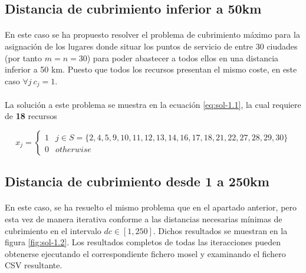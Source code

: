 \documentclass[spanish]{article}
\begin{document}
		\subsection{Distancia de cubrimiento inferior a 50km}
		\label{sec:1.1}

			\paragraph{}
			En este caso se ha propuesto resolver el problema de cubrimiento máximo para la asignación de los lugares donde situar los puntos de servicio de entre 30 ciudades (por tanto $m = n = 30$) para poder abastecer a todos ellos en una distancia inferior a 50 km. Puesto que todos los recursos presentan el mismo coste, en este caso $\forall j \ c_{j} = 1$.

			\paragraph{}
			La solución a este problema se muestra en la ecuación \eqref{eq:sol-1.1}, la cual requiere de \textbf{18} recursos

			\begin{equation}
			\label{eq:sol-1.1}
				x_{j} =
					\begin{cases}
		      	1 & j \in S = \{2,  4,  5,  9,  10,  11,  12,  13,  14,  16,  17,  18,  21,  22,  27,  28,  29,  30 \} \\
		      	0 & otherwise
			   	\end{cases}
			\end{equation}

		\subsection{Distancia de cubrimiento desde 1 a 250km}
		\label{sec:1.2}

			\paragraph{}
			En este caso, se ha resuelto el mismo problema que en el apartado anterior, pero esta vez de manera iterativa conforme a las distancias necesarias mínimas de cubrimiento en el intervalo $dc \in [1, 250]$. Dichos resultados se muestran en la figura \ref{fig:sol-1.2}. Los resultados completos de todas las iteracciones pueden obtenerse ejecutando el correspondiente fichero mosel\cite{garciparedes:mosel-examples} y examinando el fichero CSV resultante.
\end{document}
